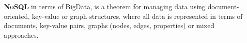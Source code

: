 {\hspace*{4mm}%
\hspace*{4mm}%
\begin{minipage}{0.8\textwidth}\raggedright
\textbf{NoSQL} in terms of BigData, is a theorem for managing data using document-oriented, key-value or graph structures, where all data is represented in terms of documents, key-value pairs, graphs (nodes, edges, properties) or mixed approaches.
\end{minipage}\\[0.5 cm]

}
